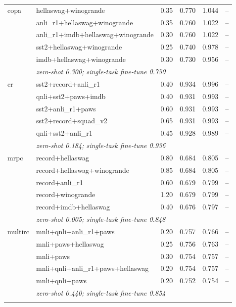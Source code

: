 \begin{table}[t]
\begin{tabular}{llrrrr}
    \addlinespace
    copa & hellaswag+winogrande & 0.35 & 0.770 & 1.044 & -- \\
     & anli\_r1+hellaswag+winogrande & 0.35 & 0.760 & 1.022 & -- \\
     & anli\_r1+imdb+hellaswag+winogrande & 0.30 & 0.760 & 1.022 & -- \\
     & sst2+hellaswag+winogrande & 0.25 & 0.740 & 0.978 & -- \\
     & imdb+hellaswag+winogrande & 0.30 & 0.730 & 0.956 & -- \\
    & \multicolumn{5}{l}{\textit{zero-shot 0.300; single-task fine-tune 0.750}} \\
    \addlinespace
    cr & sst2+record+anli\_r1 & 0.40 & 0.934 & 0.996 & -- \\
     & qnli+sst2+paws+imdb & 0.40 & 0.931 & 0.993 & -- \\
     & sst2+anli\_r1+paws & 0.60 & 0.931 & 0.993 & -- \\
     & sst2+record+squad\_v2 & 0.65 & 0.931 & 0.993 & -- \\
     & qnli+sst2+anli\_r1 & 0.45 & 0.928 & 0.989 & -- \\
    & \multicolumn{5}{l}{\textit{zero-shot 0.184; single-task fine-tune 0.936}} \\
    \addlinespace
    mrpc & record+hellaswag & 0.80 & 0.684 & 0.805 & -- \\
     & record+hellaswag+winogrande & 0.85 & 0.684 & 0.805 & -- \\
     & record+anli\_r1 & 0.60 & 0.679 & 0.799 & -- \\
     & record+winogrande & 1.20 & 0.679 & 0.799 & -- \\
     & record+imdb+hellaswag & 0.40 & 0.676 & 0.797 & -- \\
    & \multicolumn{5}{l}{\textit{zero-shot 0.005; single-task fine-tune 0.848}} \\
    \addlinespace
    multirc & mnli+qnli+anli\_r1+paws & 0.20 & 0.757 & 0.766 & -- \\
     & mnli+paws+hellaswag & 0.25 & 0.756 & 0.763 & -- \\
     & mnli+paws & 0.30 & 0.754 & 0.757 & -- \\
     & mnli+qnli+anli\_r1+paws+hellaswag & 0.20 & 0.754 & 0.757 & -- \\
     & mnli+qnli+paws & 0.20 & 0.752 & 0.754 & -- \\
    & \multicolumn{5}{l}{\textit{zero-shot 0.440; single-task fine-tune 0.854}} \\
    \addlinespace

\end{tabular}
\end{table}
